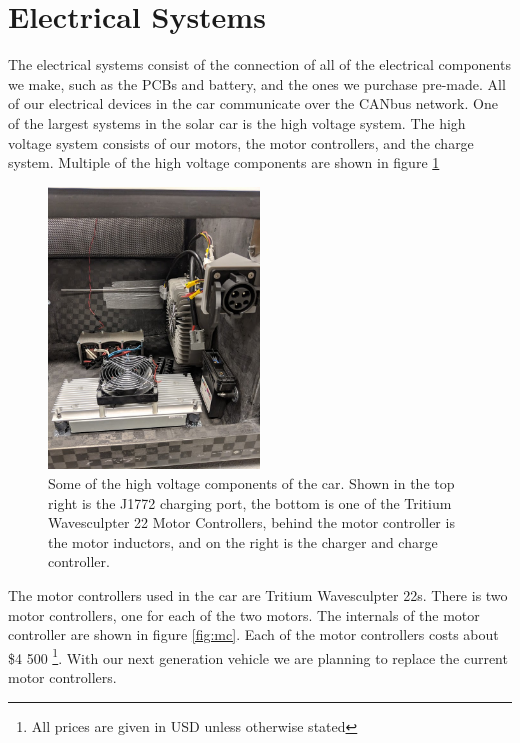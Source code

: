 \documentclass[titlepage]{article}
\begin{document}
    \section{Electrical Systems}
    The electrical systems consist of the connection of all of the
    electrical components we make, such as the PCBs and battery, and the
    ones we purchase pre-made. All of our electrical devices in the car
    communicate over the CANbus network. One of the largest systems in
    the solar car is the high voltage system. The high voltage system
    consists of our motors, the motor controllers, and the charge
    system. Multiple of the high voltage components are shown in figure
    \ref{fig:charge}
    \begin{figure}[H]
        \centering
        \includegraphics[width=0.5\textwidth]{images/car_internals.jpg}
        \caption{Some of the high voltage components of the car. Shown
            in the top right is the J1772 charging port, the bottom is
            one of the Tritium Wavesculpter 22 Motor Controllers, behind
            the motor controller is the motor inductors, and on the
        right is the charger and charge controller.}
        \label{fig:charge}
    \end{figure}
    The motor controllers used in the car are Tritium Wavesculpter 22s.
    There is two motor controllers, one for each of the two motors. The
    internals of the motor controller are shown in figure
    \ref{fig:mc}. Each of the motor controllers costs about \$4 500
    \footnote{All prices are given in USD unless otherwise stated}.
    With our next generation vehicle we are planning to replace the
    current motor controllers.
\end{document}
